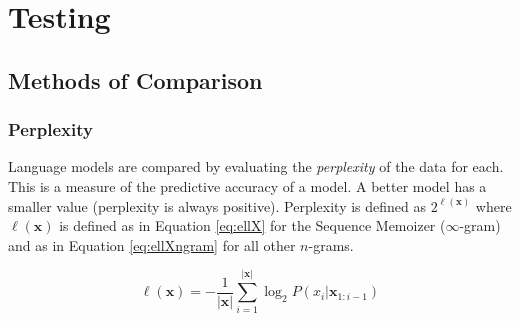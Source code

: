 \chapter{Testing}\label{chap:results}

\section{Methods of Comparison}

\subsection{Perplexity}\label{sec:perplexity}

Language models are compared by evaluating the \textit{perplexity} of the data for each. This is a measure of the predictive accuracy of a model. A better model has a smaller value (perplexity is always positive). Perplexity is defined as $2^{\ell(\boldsymbol{x})}$ where $\ell(\boldsymbol{x})$ is defined as in Equation \ref{eq:ellX} for the Sequence Memoizer ($\infty$-gram) \cite{wood2011sequence} and as in Equation \ref{eq:ellXngram} for all other $n$-grams. %

%


\begin{equation}
\ell(\boldsymbol{x})=-\frac{1}{|\boldsymbol{x}|}\sum_{i=1}^{|\boldsymbol{x}|}\log_{2}P(x_{i}|\boldsymbol{x}_{1:i-1})
\label{eq:ellX}
\end{equation}

